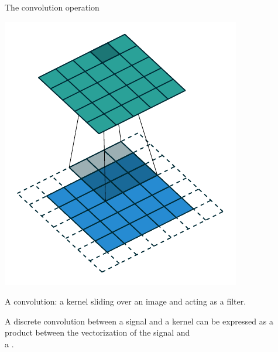 \begin{frame}{The convolution operation}
\begin{minipage}{0.24\textwidth}
  \end{minipage}
  \begin{minipage}{0.24\textwidth}
    \includegraphics[width=\textwidth]{images/conv_03.pdf}
  \end{minipage}
  \begin{minipage}{\textwidth}
    \centering
    \footnotesize{A convolution: a kernel sliding over an image and acting as a filter.}
  \end{minipage}

  
  \vspace{0.4cm}
  \pause
  \begin{mdframed}[linecolor=OrangePSL,linewidth=1pt]
    \centering
    A discrete convolution between a signal and a kernel can be expressed as a product between the vectorization of the signal and \\ a . 
  \end{mdframed}




\end{frame}
